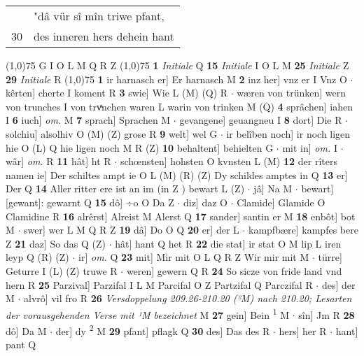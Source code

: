\documentclass[8pt,a4paper,notitlepage]{article}
\begin{document}
\begin{table}[ht]
\begin{minipage}[t]{0.5\linewidth}
\begin{tabular}{rl}
 & "dâ vür sî mîn triwe pfant,\\ 
30 & des inneren hers dehein hant\\ 
\end{tabular}
\scriptsize
\line(1,0){75} \newline
G I O L M Q R Z \newline
\line(1,0){75} \newline
\textbf{1} \textit{Initiale} Q  \textbf{15} \textit{Initiale} I O L M  \textbf{25} \textit{Initiale} Z  \textbf{29} \textit{Initiale} R  \newline
\line(1,0){75} \newline
\textbf{1} ir harnasch er] Er harnasch M \textbf{2} inz her] vnz er I Vnz O  $\cdot$ kêrten] cherte I koment R \textbf{3} swie] Wie L (M) (Q) R  $\cdot$ wæren von trünken] wern von trunches I von trvͯnchen waren L warin von trinken M (Q) \textbf{4} sprâchen] iahen I \textbf{6} iuch] \textit{om.} M \textbf{7} sprach] Sprachen M  $\cdot$ gevangene] geuangneu I \textbf{8} dort] Die R  $\cdot$ solchiu] alsolhiv O (M) (Z) grose R \textbf{9} welt] wel G  $\cdot$ ir belîben noch] ir noch ligen hie O (L) Q hie ligen noch M R (Z) \textbf{10} behaltent] behielten G  $\cdot$ mit in] \textit{om.} I  $\cdot$ wâr] \textit{om.} R \textbf{11} hât] ht R  $\cdot$ schœnsten] hohsten O kvnsten L (M) \textbf{12} der rîters namen ie] Der schiltes ampt ie O L (M) (R) (Z) Dy schildes amptes in Q \textbf{13} er] Der Q \textbf{14} Aller ritter ere ist an im (in Z ) bewart L (Z)  $\cdot$ jâ] Na M  $\cdot$ bewart] [gewant]: gewarnt Q \textbf{15} dô] ÷o O Da Z  $\cdot$ diz] daz O  $\cdot$ Clamide] Glamide O Clamidine R \textbf{16} alrêrst] Alreist M Alerst Q \textbf{17} sander] santin er M \textbf{18} enbôt] bot M  $\cdot$ swer] wer L M Q R Z \textbf{19} dâ] Do O Q \textbf{20} er] der L  $\cdot$ kampfbære] kampfes bere Z \textbf{21} daz] So das Q (Z)  $\cdot$ hât] hant Q het R \textbf{22} die stat] ir stat O M lip L iren leyp Q (R) (Z)  $\cdot$ ir] \textit{om.} Q \textbf{23} mit] Mir mit O L Q R Z Wir mir mit M  $\cdot$ türre] Geturre I (L) (Z) truwe R  $\cdot$ weren] gewern Q R \textbf{24} So sicze von fride land vnd hern R \textbf{25} Parzival] Parzifal I L M Parcifal O Z Partzifal Q Parczifal R  $\cdot$ des] der M  $\cdot$ alvrô] vil fro R \textbf{26} \textit{Versdoppelung 209.26-210.20 (²M) nach 210.20; Lesarten der vorausgehenden Verse mit ¹M bezeichnet} M  \textbf{27} gein] Bein \textsuperscript{1}\hspace{-1.3mm} M  $\cdot$ sîn] Jm R \textbf{28} dô] Da M  $\cdot$ der] dy \textsuperscript{2}\hspace{-1.3mm} M \textbf{29} pfant] pflagk Q \textbf{30} des] Das des R  $\cdot$ hers] her R  $\cdot$ hant] pant Q \newline

\end{minipage}
\end{table}
\end{document}
